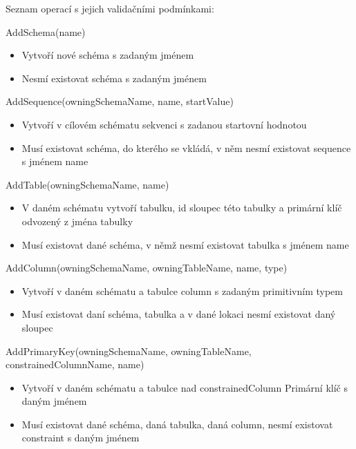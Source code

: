 \documentclass[11pt,twoside,a4paper]{book}
\begin{document}
Seznam operací s jejich validačními podmínkami:
\begin{list}{Operace :}{}
  \item AddSchema(name)
  \begin{itemize}
    \item Vytvoří nové schéma s zadaným jménem
    \item Nesmí existovat schéma s zadaným
    jménem
  \end{itemize}
  
  \item AddSequence(owningSchemaName, name, startValue)
  \begin{itemize}
    \item Vytvoří v cílovém schématu sekvenci s zadanou startovní hodnotou
    \item Musí existovat schéma, do kterého se vkládá, v něm nesmí existovat
    sequence s jménem name
  \end{itemize}
  
  \item AddTable(owningSchemaName, name)
  \begin{itemize}
    \item V daném schématu vytvoří tabulku, id sloupec této tabulky a primární
    klíč odvozený z jména tabulky
    \item Musí existovat dané schéma, v
    němž nesmí existovat tabulka s jménem name
  \end{itemize}
  
  \item AddColumn(owningSchemaName, owningTableName, name, type)
  \begin{itemize}
    \item Vytvoří v daném schématu a tabulce column s zadaným primitivním typem
    \item Musí existovat daní schéma, tabulka a v dané lokaci nesmí existovat
    daný sloupec
  \end{itemize}
  
  \item AddPrimaryKey(owningSchemaName, owningTableName,
  constrainedColumnName, name)
  \begin{itemize}
    \item Vytvoří v daném schématu a tabulce nad constrainedColumn Primární klíč
    s daným jménem
    \item Musí existovat dané schéma, daná tabulka, daná column, nesmí existovat
    constraint s daným jménem
  \end{itemize}


\end{list}
\end{document}

